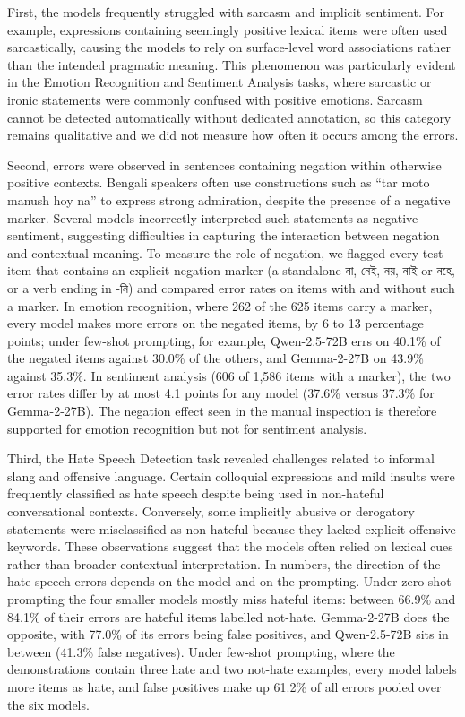 \documentclass[10pt,letterpaper]{article}
\newcommand{\banglaNegationExample}{tar moto manush hoy na}
\newcommand{\banglaNegationExample}{{\bengalifont তার মতো মানুষ হয় না}}
\begin{document}
First, the models frequently struggled with sarcasm and implicit sentiment. For example, expressions containing seemingly positive lexical items were often used sarcastically, causing the models to rely on surface-level word associations rather than the intended pragmatic meaning. This phenomenon was particularly evident in the Emotion Recognition and Sentiment Analysis tasks, where sarcastic or ironic statements were commonly confused with positive emotions. Sarcasm cannot be detected automatically without dedicated annotation, so this category remains qualitative and we did not measure how often it occurs among the errors.

Second, errors were observed in sentences containing negation within otherwise positive contexts. Bengali speakers often use constructions such as ``\banglaNegationExample'' to express strong admiration, despite the presence of a negative marker. Several models incorrectly interpreted such statements as negative sentiment, suggesting difficulties in capturing the interaction between negation and contextual meaning. To measure the role of negation, we flagged every test item that contains an explicit negation marker (a standalone না, নেই, নয়, নাই or নহে, or a verb ending in -নি) and compared error rates on items with and without such a marker. In emotion recognition, where 262 of the 625 items carry a marker, every model makes more errors on the negated items, by 6 to 13 percentage points; under few-shot prompting, for example, Qwen-2.5-72B errs on 40.1\% of the negated items against 30.0\% of the others, and Gemma-2-27B on 43.9\% against 35.3\%. In sentiment analysis (606 of 1,586 items with a marker), the two error rates differ by at most 4.1 points for any model (37.6\% versus 37.3\% for Gemma-2-27B). The negation effect seen in the manual inspection is therefore supported for emotion recognition but not for sentiment analysis.

Third, the Hate Speech Detection task revealed challenges related to informal slang and offensive language. Certain colloquial expressions and mild insults were frequently classified as hate speech despite being used in non-hateful conversational contexts. Conversely, some implicitly abusive or derogatory statements were misclassified as non-hateful because they lacked explicit offensive keywords. These observations suggest that the models often relied on lexical cues rather than broader contextual interpretation. In numbers, the direction of the hate-speech errors depends on the model and on the prompting. Under zero-shot prompting the four smaller models mostly miss hateful items: between 66.9\% and 84.1\% of their errors are hateful items labelled not-hate. Gemma-2-27B does the opposite, with 77.0\% of its errors being false positives, and Qwen-2.5-72B sits in between (41.3\% false negatives). Under few-shot prompting, where the demonstrations contain three hate and two not-hate examples, every model labels more items as hate, and false positives make up 61.2\% of all errors pooled over the six models.
\end{document}
